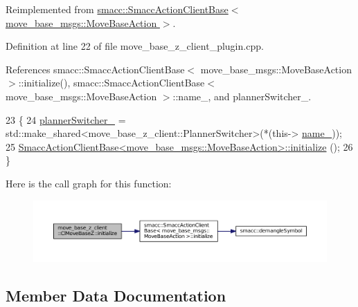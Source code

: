 Reimplemented from \hyperlink{classsmacc_1_1SmaccActionClientBase_a0224d7482b50a706f99bd280495ef1af}{smacc\+::\+Smacc\+Action\+Client\+Base$<$ move\+\_\+base\+\_\+msgs\+::\+Move\+Base\+Action $>$}.



Definition at line 22 of file move\+\_\+base\+\_\+z\+\_\+client\+\_\+plugin.\+cpp.



References smacc\+::\+Smacc\+Action\+Client\+Base$<$ move\+\_\+base\+\_\+msgs\+::\+Move\+Base\+Action $>$\+::initialize(), smacc\+::\+Smacc\+Action\+Client\+Base$<$ move\+\_\+base\+\_\+msgs\+::\+Move\+Base\+Action $>$\+::name\+\_\+, and planner\+Switcher\+\_\+.


\begin{DoxyCode}
23 \{
24     \hyperlink{classmove__base__z__client_1_1ClMoveBaseZ_ac57d2293bc0a5c4fcef326379822cc5e}{plannerSwitcher\_} = std::make\_shared<move\_base\_z\_client::PlannerSwitcher>(*(this->
      \hyperlink{classsmacc_1_1SmaccActionClientBase_a8464e3ec514e57333339fc538a2203f4}{name\_}));
25     \hyperlink{classsmacc_1_1SmaccActionClientBase_a0224d7482b50a706f99bd280495ef1af}{SmaccActionClientBase<move\_base\_msgs::MoveBaseAction>::initialize}
      ();
26 \}
\end{DoxyCode}


Here is the call graph for this function\+:
\nopagebreak
\begin{figure}[H]
\begin{center}
\leavevmode
\includegraphics[width=350pt]{classmove__base__z__client_1_1ClMoveBaseZ_a082cef8bf5dbd0ec06adfe2a7aefbf70_cgraph}
\end{center}
\end{figure}




\subsection{Member Data Documentation}
